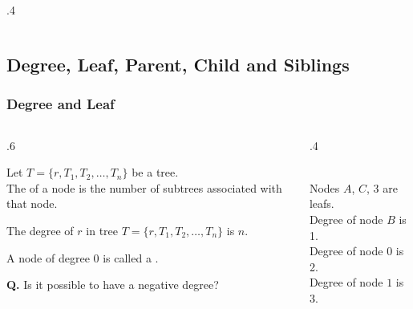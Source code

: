 \documentclass[10pt]{beamer}
\begin{document}
\begin{frame}[t]
\begin{columns}[T]
\begin{column}{.4\linewidth}
	\end{column} %
	\end{columns} %
\end{frame}



\subsection{Degree, Leaf, Parent, Child and Siblings}
\begin{frame}[t]\frametitle{Degree and Leaf}
	\begin{columns}[T] %
	\begin{column}{.6\linewidth} %
	{\footnotesize 
		\begin{definition}
			Let $T = \{r, T_{1}, T_{2}, \ldots, T_{n}\}$ be a tree.\\					    
			The  of a node is the number of subtrees associated with that node.				
		\end{definition}	
		\begin{example}
			{\scriptsize
			The degree of $r$ in tree $T = \{r, T_{1}, T_{2}, \ldots, T_{n}\}$  is $n$.
			} %
		\end{example}		
		\begin{definition}
			A node of degree 0  is called a \hDefined{leaf}.
		\end{definition}	
		\textbf{Q.}
		Is it possible to have a negative degree?		
	} %
	\end{column} %
	\begin{column}{.4\linewidth} %
		\begin{example}
		{\scriptsize
			
			\\
			Nodes $A$, $C$, $3$ are leafs.\\
			Degree of node $B$ is 1.\\
			Degree of node $0$ is 2.\\
			Degree of node $1$ is 3.\\
		} %
		\end{example}
	\end{column} %
	\end{columns} %
\end{frame}
\end{document}

